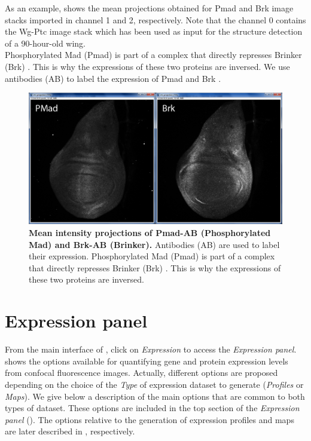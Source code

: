 As an example,  shows the mean projections obtained for Pmad and Brk image stacks imported in channel 1 and 2, respectively. Note that the channel 0 contains the Wg-Ptc image stack which has been used as input for the structure detection of a 90-hour-old wing.\\

Phosphorylated Mad (Pmad) is part of a complex that directly represses Brinker (Brk) \autocite{affolter2007decapentaplegic}. This is why the expressions of these two proteins are inversed. We use antibodies (AB) to label the expression of Pmad and Brk \autocite{hamaratoglu2011dpp,schaffter2013}.

\begin{figure}[!h]
\centering
\includegraphics[scale=0.26]{images/wingj_expression_pmad_brk_projection.jpg}
\caption{\textbf{Mean intensity projections of Pmad-AB (Phosphorylated Mad) and Brk-AB (Brinker).} Antibodies (AB) are used to label their expression. Phosphorylated Mad (Pmad) is part of a complex that directly represses Brinker (Brk) \autocite{affolter2007decapentaplegic}. This is why the expressions of these two proteins are inversed.}
\label{fig:expression_pmad_brk_projection}
\end{figure}

\section{Expression panel}
From the main interface of \wingj, click on \textit{Expression} to access the \textit{Expression panel}.  shows the options available for quantifying gene and protein expression levels from confocal fluorescence images. Actually, different options are proposed depending on the choice of the \textit{Type} of expression dataset to generate (\textit{Profiles} or \textit{Maps}). We give below a description of the main options that are common to both types of dataset. These options are included in the top section of the \textit{Expression panel} (). The options relative to the generation of expression profiles and maps are later described in , respectively.

